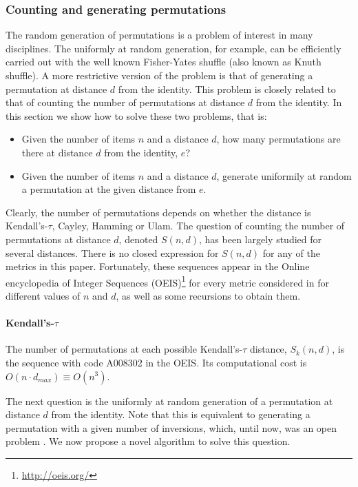 \documentclass[article,nojss]{jss}
\begin{document}
\subsubsection{Counting and generating permutations}%
\label{sec:counting}
The random generation of permutations is  a problem of interest in many disciplines. The uniformly at random generation, for example, can be efficiently carried out with the well known Fisher-Yates shuffle (also known as Knuth shuffle). A more restrictive version of the problem is that of generating a permutation at distance $d$ from the identity. This problem is closely related to that of counting the number of permutations at distance $d$ from the identity. In this section we show how to solve these two problems, that is:
\begin{itemize}
\item Given the number of items $n$ and a distance $d$, how many permutations are there at distance $d$ from the identity, $e$?
\item Given the number of items $n$ and a distance $d$, generate uniformily at random a permutation at the given distance from $e$.
\end{itemize}

Clearly, the number of permutations depends on whether the distance is Kendall's-$\tau$, Cayley, Hamming or Ulam. The question of counting the number of permutations at distance $d$, denoted $S(n,d)$, has been largely studied for several distances. There is no closed expression for $S(n,d)$ for any of the metrics in this paper. Fortunately, these sequences appear in the Online encyclopedia of Integer Sequences (OEIS)\footnote{\url{http://oeis.org/}} for every metric  considered in  for different values of $n$ and $d$, as well as some recursions to obtain them. 

\paragraph{Kendall's-$\tau$}
The number of permutations at each possible Kendall's-$\tau$ distance, $S_k(n,d)$, is the sequence with code A008302 in the OEIS. Its computational cost is $O(n \cdot d_{max}) \equiv O(n^3)$. 

The next question is the uniformly at random generation of a permutation at distance $d$ from the identity. Note that this is equivalent to generating a permutation with a given number of inversions, which, until now, was an open problem \citep{Arndt2010}. We now propose a novel algorithm to solve this question. 
\end{document}
